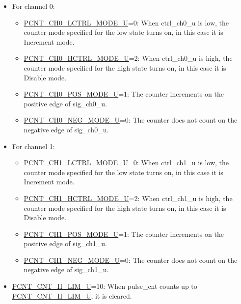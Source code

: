 \documentclass[main\_\_EN.tex]{subfiles}
\begin{document}
\begin{itemize}
    \item For channel 0:
    \begin{itemize}
        \item \hyperref[fielddesc:PCNTCH0LCTRLMODEUN]{PCNT\_CH0\_LCTRL\_MODE\_U}=0: When ctrl\_ch0\_u is low, the counter mode specified for the low state turns on, in this case it is Increment mode.

        \item \hyperref[fielddesc:PCNTCH0HCTRLMODEUN]{PCNT\_CH0\_HCTRL\_MODE\_U}=2: When ctrl\_ch0\_u is high, the counter mode specified for the high state turns on, in this case it is Disable mode.

        \item \hyperref[fielddesc:PCNTCH0POSMODEUN]{PCNT\_CH0\_POS\_MODE\_U}=1: The counter increments on the positive edge of sig\_ch0\_u.

        \item \hyperref[fielddesc:PCNTCH0NEGMODEUN]{PCNT\_CH0\_NEG\_MODE\_U}=0: The counter does not count on the negative edge of sig\_ch0\_u.

    \end{itemize}

    \item For channel 1:
    \begin{itemize}
        \item \hyperref[fielddesc:PCNTCH1LCTRLMODEUN]{PCNT\_CH1\_LCTRL\_MODE\_U}=0: When ctrl\_ch1\_u is low, the counter mode specified for the low state turns on, in this case it is Increment mode.

        \item \hyperref[fielddesc:PCNTCH1HCTRLMODEUN]{PCNT\_CH1\_HCTRL\_MODE\_U}=2: When ctrl\_ch1\_u is high, the counter mode specified for the high state turns on, in this case it is Disable mode.

        \item \hyperref[fielddesc:PCNTCH1POSMODEUN]{PCNT\_CH1\_POS\_MODE\_U}=1: The counter increments on the positive edge of sig\_ch1\_u.

        \item \hyperref[fielddesc:PCNTCH1NEGMODEUN]{PCNT\_CH1\_NEG\_MODE\_U}=0: The counter does not count on the negative edge of sig\_ch1\_u.

    \end{itemize}

    \item \hyperref[fielddesc:PCNTCNTHLIMUN]{PCNT\_CNT\_H\_LIM\_U}=10: When pulse\_cnt counts up to \hyperref[fielddesc:PCNTCNTHLIMUN]{PCNT\_CNT\_H\_LIM\_U}, it is cleared.

\end{itemize}
\end{document}
